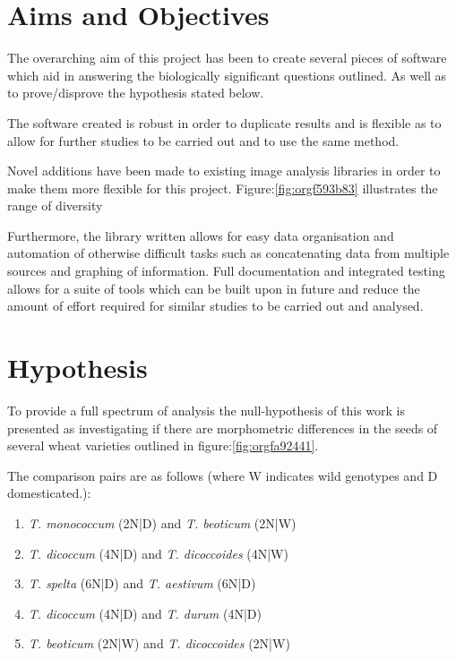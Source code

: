 \documentclass[11pt]{report}
\begin{document}
\section{Aims and Objectives}
\label{sec:org4e4cdab}

The overarching aim of this project has been to create several pieces of software which aid in answering the biologically significant questions outlined. As well as to prove/disprove the hypothesis stated below.

The software created is robust in order to duplicate results and is flexible as to allow for further studies to be carried out and to use the same method.

Novel additions have been made to existing image analysis libraries in order to make them more flexible for this project. Figure:\ref{fig:orgf593b83} illustrates the range of diversity

Furthermore, the library written allows for easy data organisation and automation of otherwise difficult tasks such as concatenating data from multiple sources and graphing of information. Full documentation and integrated testing allows for a suite of tools which can be built upon in future and reduce the amount of effort required for similar studies to be carried out and analysed.

\section{Hypothesis}
\label{sec:org586015e}
To provide a full spectrum of analysis the null-hypothesis of this work is presented as investigating if there are morphometric differences in the seeds of several wheat varieties outlined in figure:\ref{fig:orgfa92441}.

The comparison pairs are as follows (where W indicates wild genotypes and D domesticated.):

\begin{enumerate}
\item \emph{T. monococcum} (2N|D) and \emph{T. beoticum} (2N|W)
\item \emph{T. dicoccum} (4N|D) and \emph{T. dicoccoides} (4N|W)
\item \emph{T. spelta} (6N|D) and \emph{T. aestivum} (6N|D)
\item \emph{T. dicoccum} (4N|D) and \emph{T. durum} (4N|D)
\item \emph{T. beoticum} (2N|W) and \emph{T. dicoccoides} (2N|W)
\end{enumerate}
\end{document}
